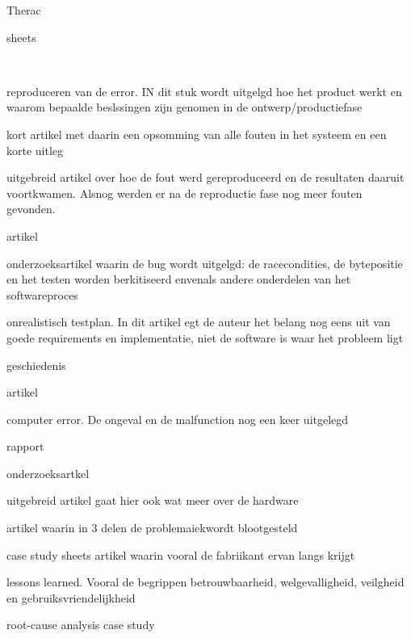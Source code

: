 Therac


sheets

\cite{rogaway2004therac25}



~\cite{wikiTherac25}


reproduceren van de error. IN dit stuk wordt uitgelgd hoe het product werkt en waarom bepaalde beslssingen zijn genomen in de ontwerp/productiefase

\cite{lynch2017theracRaceConditions}
kort artikel met daarin een opsomming van alle fouten in het systeem en een korte uitleg

\cite{lim1998theracdisaster}
uitgebreid artikel over hoe de fout werd gereproduceerd en de resultaten daaruit voortkwamen. Alsnog werden er na de reproductie fase nog meer fouten gevonden.

\cite{fabio26102015therac25}
artikel

\cite{ethicsunwrappedTherac25}
onderzoeksartikel waarin de bug wordt uitgelgd: de racecondities, de bytepositie en het testen worden berkitiseerd envenals andere onderdelen van het softwareproces


onrealistisch testplan. In dit artikel egt de auteur het belang nog eens uit van goede requirements en implementatie, niet de software is waar het probleem ligt


geschiedenis

\cite{casesHistoryTherac25}
artikel

\cite{caballero2019Therac25}
computer error. De ongeval en de malfunction nog een keer uitgelegd

\cite{rose1994theracFatalDose}
rapport

\cite{levesonMITTherac25}

\cite{grant1978theracevaluation}
onderzoeksartkel

\cite{turnerTheracAccidentsInvestigations}

\cite{turner1993TheracAccidentsInvestigations}
uitgebreid artikel gaat hier ook wat meer over de hardware

\cite{wang2017industrialdesignengineering}
artikel waarin in 3 delen de problemaiekwordt blootgesteld

\cite{levesonturner1993theracpart2}
case study sheets
artikel waarin vooral de fabriikant ervan langs krijgt

\cite{porelloTheraccFailure}
lessons learned. Vooral de begrippen betrouwbaarheid, welgevalligheid, veilgheid en gebruiksvriendelijkheid

\cite{theracIncidents}
root-cause analysis
case study


